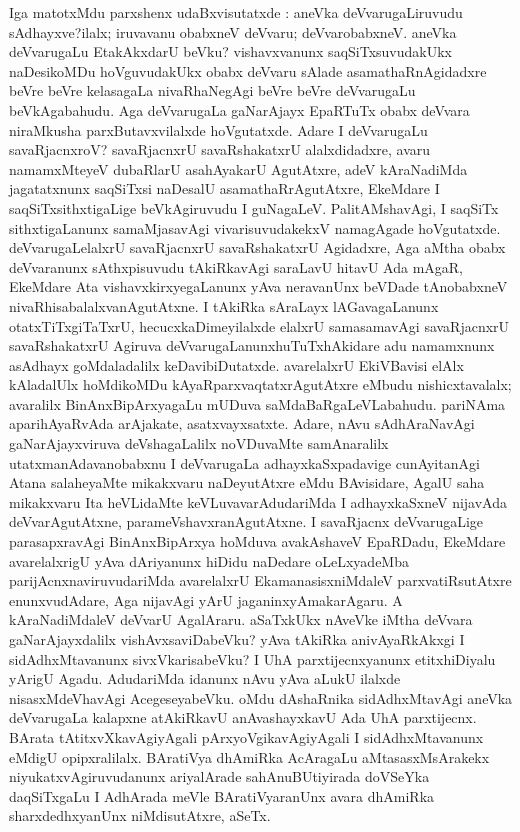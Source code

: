 Iga matotxMdu parxshenx udaBxvisutatxde : aneVka deVvarugaLiruvudu sAdhayxve?\break ilalx; iruvavanu obabxneV deVvaru; deVvarobabxneV. aneVka deVvarugaLu EtakAkxdarU beVku? vishavxvanunx saqSiTxsuvudakUkx naDesikoMDu hoVguvudakUkx obabx deVvaru sAlade asamathaRnAgidadxre beVre beVre kelasagaLa nivaRhaNegAgi beVre beVre deVvarugaLu beVkAga\-bahudu. Aga deVvarugaLa gaNarAjayx EpaRTuTx obabx deVvara niraMkusha parxButavxvilalxde hoVgutatxde. Adare I deVvarugaLu savaRjacnxroV? savaRjacnxrU savaRshakatxrU alalx\-didadxre, avaru namamxMteyeV dubaRlarU asahAyakarU AgutAtxre, adeV kAraNa\-diMda jagatatxnunx saqSiTxsi naDesalU asamathaRrAgutAtxre, EkeMdare I saqSiTxsithxtigaLige beVkAgiruvudu I guNagaLeV. PalitAMshavAgi, I saqSiTx sithxtigaLanunx samaMjasavAgi vivarisuvudakekxV namagAgade hoVgutatxde. deVvarugaLelalxrU savaRjacnxrU savaRshakatxrU Agidadxre, Aga aMtha obabx deVvaranunx sAthxpisuvudu tAkiRkavAgi saraLavU hitavU Ada mAgaR, EkeMdare Ata vishavxkirxyegaLanunx yAva neravanUnx beVDade tAnobabxneV nivaR\-hisabalalxvanAgutAtxne. I tAkiRka sAraLayx lAGavagaLanunx otatxTiTxgiTaTxrU, hecucxkaDime\-yilalxde elalxrU samasamavAgi savaRjacnxrU savaRshakatxrU Agiruva deVvarugaLanunx\break huTuTxhAkidare adu namamxnunx asAdhayx goMdaladalilx keDavibiDutatxde. avarelalxrU EkiV\-Bavisi elAlx kAladalUlx hoMdikoMDu kAyaRparxvaqtatxrAgutAtxre eMbudu nishicxtavalalx; avaralilx BinAnxBipArxyagaLu mUDuva saMdaBaRgaLeVLabahudu. pariNAma apari\break\-hAyaRvAda arAjakate, asatxvayxsatxte. Adare, nAvu sAdhAraNavAgi gaNarAjayx\-viruva deVshagaLalilx noVDuvaMte samAnaralilx utatxmanAdavanobabxnu I deVvarugaLa adhayxkaSx\-padavige cunAyitanAgi Atana salaheyaMte mikakxvaru naDeyutAtxre eMdu BAvisi\-dare, AgalU saha mikakxvaru Ita heVLidaMte keVLuvavarAdudariMda I adhayxkaSxneV nija\-vAda deVvarAgutAtxne, parameVshavxranAgutAtxne. I savaRjacnx deVvarugaLige parasapxra\-vAgi BinAnxBipArxya hoMduva avakAshaveV EpaRDadu, EkeMdare avarelalxrigU yAva dAriyanunx hiDidu naDedare oLeLxyadeMba parijAcnxnaviruvudariMda avarelalxrU Eka\-manasisxniMdaleV parxvatiRsutAtxre enunxvudAdare, Aga nijavAgi yArU jaganinx\-yAmaka\-rAgaru. A kAraNadiMdaleV deVvarU AgalAraru. aSaTxkUkx nAveVke iMtha deVvara gaNarAjayxdalilx vishAvxsaviDabeVku? yAva tAkiRka anivAyaRkAkxgi I sidAdhxMtavanunx sivxVkarisabeVku? I UhA parxtijecnxyanunx etitxhiDiyalu yArigU Agadu. Aduda\-riMda idanunx nAvu yAva aLukU ilalxde nisasxMdeVhavAgi AcegeseyabeVku. oMdu dAshaRnika sidAdhxMtavAgi aneVka deVvarugaLa kalapxne atAkiRkavU anAvashayxkavU Ada UhA parxtijecnx. BArata tAtitxvXkavAgiyAgali pArxyoVgikavAgiyAgali I sidAdhxMta\-vanunx eMdigU opipxralilalx. BAratiVya dhAmiRka AcAragaLu aMtasasxMsArakekx niyukatx\-vAgiruvudanunx ariyalArade sahAnuBUtiyirada doVSeYka daqSiTxgaLu I AdhArada meVle BAratiVyaranUnx avara dhAmiRka sharxdedhxyanUnx niMdisutAtxre, aSeTx.

